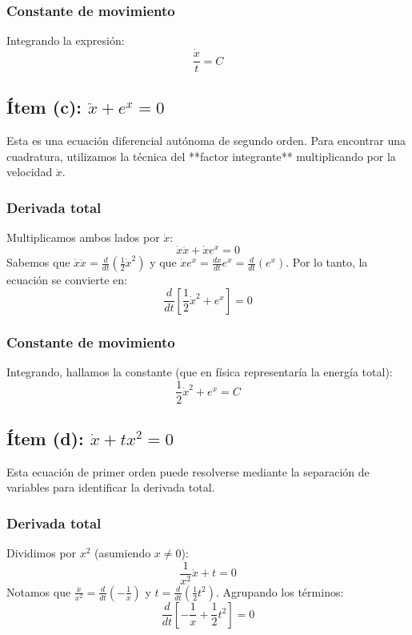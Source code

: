 \documentclass[a4paper]{article}
\begin{document}
\subsubsection{Constante de movimiento}
Integrando la expresión:
$$ \frac{\dot{x}}{t} = C $$

\subsection{Ítem (c): $\ddot{x} + e^x = 0$}

Esta es una ecuación diferencial autónoma de segundo orden. Para encontrar una cuadratura, utilizamos la técnica del **factor integrante** multiplicando por la velocidad $\dot{x}$.

\subsubsection{Derivada total}
Multiplicamos ambos lados por $\dot{x}$:
$$ \dot{x}\ddot{x} + \dot{x} e^x = 0 $$
Sabemos que $\dot{x}\ddot{x} = \frac{d}{dt} \left( \frac{1}{2}\dot{x}^2 \right)$ y que $\dot{x} e^x = \frac{dx}{dt} e^x = \frac{d}{dt} (e^x)$.
Por lo tanto, la ecuación se convierte en:
$$ \frac{d}{dt} \left[ \frac{1}{2}\dot{x}^2 + e^x \right] = 0 $$

\subsubsection{Constante de movimiento}
Integrando, hallamos la constante (que en física representaría la energía total):
$$ \frac{1}{2}\dot{x}^2 + e^x = C $$

\subsection{Ítem (d): $\dot{x} + tx^2 = 0$}

Esta ecuación de primer orden puede resolverse mediante la separación de variables para identificar la derivada total.

\subsubsection{Derivada total}
Dividimos por $x^2$ (asumiendo $x \neq 0$):
$$ \frac{1}{x^2}\dot{x} + t = 0 $$
Notamos que $\frac{\dot{x}}{x^2} = \frac{d}{dt} \left( -\frac{1}{x} \right)$ y $t = \frac{d}{dt} \left( \frac{1}{2}t^2 \right)$.
Agrupando los términos:
$$ \frac{d}{dt} \left[ -\frac{1}{x} + \frac{1}{2}t^2 \right] = 0 $$
\end{document}
